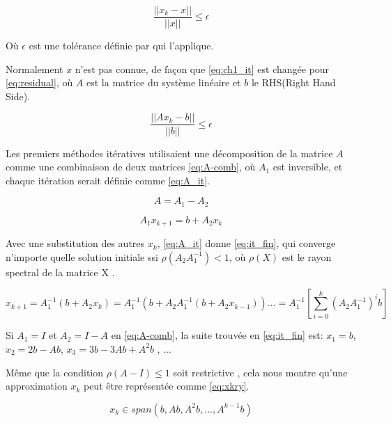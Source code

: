 \documentclass[a4paper, 15pt]{report}
\begin{document}
    \begin{equation}\label{eq:ch1_it}
       \frac{||x_{k} - x||}{||x||} \leq \epsilon
    \end{equation}

    Où $\epsilon$ est une tolérance définie par qui l'applique.

    Normalement $x$ n'est pas connue, de façon que \ref{eq:ch1_it} est changée pour \ref{eq:residual}, où $A$ est la matrice du système linéaire et $b$ le RHS(Right Hand Side).

    \begin{equation}\label{eq:residual}
        \frac{||Ax_{k} - b||}{||b||} \leq \epsilon
    \end{equation}

    Les premiers méthodes itératives utilisaient une décomposition de la matrice $A$ comme une combinaison de deux matrices \ref{eq:A-comb}, où $A_{1}$ est inversible, et chaque itération serait définie comme \ref{eq:A_it}.

    \begin{equation}\label{eq:A-comb}
        A = A_{1} - A_{2}
    \end{equation}

    \begin{equation}\label{eq:A_it}
        A_{1} x_{k+1} = b + A_{2}x_{k}
    \end{equation}

    Avec une substitution des autres $x_{k}$, \ref{eq:A_it} donne \ref{eq:it_fin}, qui converge n'importe quelle solution initiale ssi $\rho(A_{2}A_{1}^{-1}) < 1$, où $\rho(X)$ est le rayon spectral de la matrice X \cite{bonnet}.

    \begin{equation}\label{eq:it_fin}
        x_{k+1} = A_{1}^{-1}(b + A_{2}x_{k}) = A_{1}^{-1}(b + A_{2}A_{1}^{-1}(b + A_{2}x_{k-1}))... = A_{1}^{-1} \left[ \sum_{i=0}^{k} (A_{2}A_{1}^{-1})^{i}b\right]
    \end{equation}

    Si $A_{1} = I$ et $A_{2} = I - A$ en \ref{eq:A-comb}, la suite trouvée en \ref{eq:it_fin} est: $x_{1} = b$,$x_{2} = 2b- Ab$, $x_{3} = 3b-3Ab+A^{2}b$ , ...

    Même que la condition $\rho(A-I) \leq 1$ soit restrictive \cite{bonnet}, cela nous montre qu'une approximation $x_{k}$ peut être représentée comme \ref{eq:xkry}.

    \begin{equation}\label{eq:xkry}
        x_{k} \in span(b,Ab,A^{2}b,...,A^{k-1}b)
    \end{equation}
\end{document}
